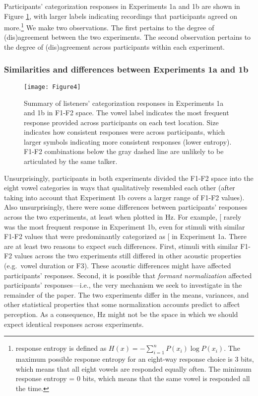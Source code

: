 \documentclass[preprint]{JASA}
\begin{document}
Participants' categorization responses in Experiments 1a and 1b are shown in Figure \ref{fig:Figure4}, with larger labels indicating recordings that participants agreed on more.\footnote{\citet{shannon1948} response entropy is defined as \(H(x) = -\sum_{i=1}^{n} P(x_{i}) \log P(x_{i})\). The maximum possible response entropy for an eight-way response choice is 3 bits, which means that all eight vowels are responded equally often. The minimum response entropy = 0 bits, which means that the same vowel is responded all the time.} We make two observations. The first pertains to the degree of (dis)agreement between the two experiments. The second observation pertains to the degree of (dis)agreement across participants within each experiment.

\subsubsection{Similarities and differences between Experiments 1a and 1b}\label{similarities-and-differences-between-experiments-1a-and-1b}

\begin{figure}

{\centering \texttt{[image: Figure4]} 

}

\caption{Summary of listeners' categorization responses in Experiments 1a and 1b in F1-F2 space. The vowel label indicates the most frequent response provided across participants on each test location. Size indicates how consistent responses were across participants, which larger symbols indicating more consistent responses (lower entropy). F1-F2 combinations below the gray dashed line are unlikely to be articulated by the same talker.}\label{fig:Figure4}
\end{figure}



Unsurprisingly, participants in both experiments divided the F1-F2 space into the eight vowel categories in ways that qualitatively resembled each other (after taking into account that Experiment 1b covers a larger range of F1-F2 values). Also unsurprisingly, there were some differences between participants' responses across the two experiments, at least when plotted in Hz. For example, {[}\textipa{u}{]} rarely was the most frequent response in Experiment 1b, even for stimuli with similar F1-F2 values that were predominantly categorized as {[}\textipa{u}{]} in Experiment 1a. There are at least two reasons to expect such differences. First, stimuli with similar F1-F2 values across the two experiments still differed in other acoustic properties (e.g.~vowel duration or F3). These acoustic differences might have affected participants' responses. Second, it is possible that \emph{formant normalization} affected participants' responses---i.e., the very mechanism we seek to investigate in the remainder of the paper. The two experiments differ in the means, variances, and other statistical properties that some normalization accounts predict to affect perception. As a consequence, Hz might not be the space in which we should expect identical responses across experiments.
\end{document}
